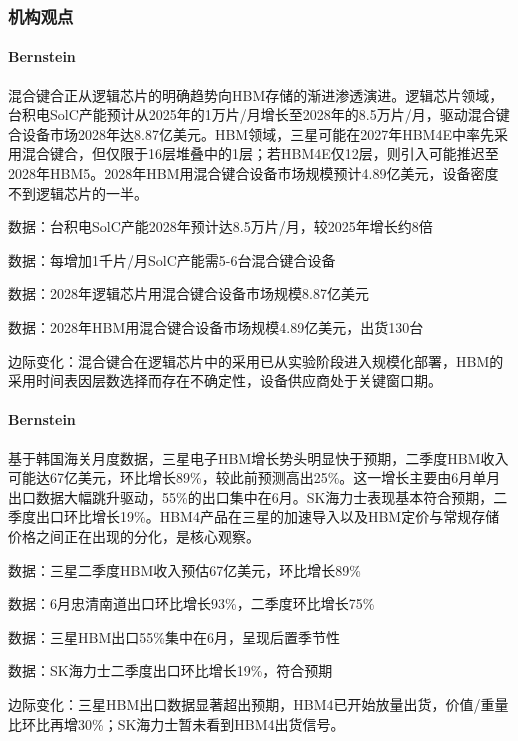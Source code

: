 \documentclass[11pt]{ctexart}
\begin{document}
\subsubsection*{机构观点}
\paragraph{Bernstein} 混合键合正从逻辑芯片的明确趋势向HBM存储的渐进渗透演进。逻辑芯片领域，台积电SolC产能预计从2025年的1万片/月增长至2028年的8.5万片/月，驱动混合键合设备市场2028年达8.87亿美元。HBM领域，三星可能在2027年HBM4E中率先采用混合键合，但仅限于16层堆叠中的1层；若HBM4E仅12层，则引入可能推迟至2028年HBM5。2028年HBM用混合键合设备市场规模预计4.89亿美元，设备密度不到逻辑芯片的一半。
{\small\color{refgray}数据：台积电SolC产能2028年预计达8.5万片/月，较2025年增长约8倍\par}
{\small\color{refgray}数据：每增加1千片/月SolC产能需5-6台混合键合设备\par}
{\small\color{refgray}数据：2028年逻辑芯片用混合键合设备市场规模8.87亿美元\par}
{\small\color{refgray}数据：2028年HBM用混合键合设备市场规模4.89亿美元，出货130台\par}
{\small\color{refgray}边际变化：混合键合在逻辑芯片中的采用已从实验阶段进入规模化部署，HBM的采用时间表因层数选择而存在不确定性，设备供应商处于关键窗口期。\par}
\paragraph{Bernstein} 基于韩国海关月度数据，三星电子HBM增长势头明显快于预期，二季度HBM收入可能达67亿美元，环比增长89\%，较此前预测高出25\%。这一增长主要由6月单月出口数据大幅跳升驱动，55\%的出口集中在6月。SK海力士表现基本符合预期，二季度出口环比增长19\%。HBM4产品在三星的加速导入以及HBM定价与常规存储价格之间正在出现的分化，是核心观察。
{\small\color{refgray}数据：三星二季度HBM收入预估67亿美元，环比增长89\%\par}
{\small\color{refgray}数据：6月忠清南道出口环比增长93\%，二季度环比增长75\%\par}
{\small\color{refgray}数据：三星HBM出口55\%集中在6月，呈现后置季节性\par}
{\small\color{refgray}数据：SK海力士二季度出口环比增长19\%，符合预期\par}
{\small\color{refgray}边际变化：三星HBM出口数据显著超出预期，HBM4已开始放量出货，价值/重量比环比再增30\%；SK海力士暂未看到HBM4出货信号。\par}
\end{document}
